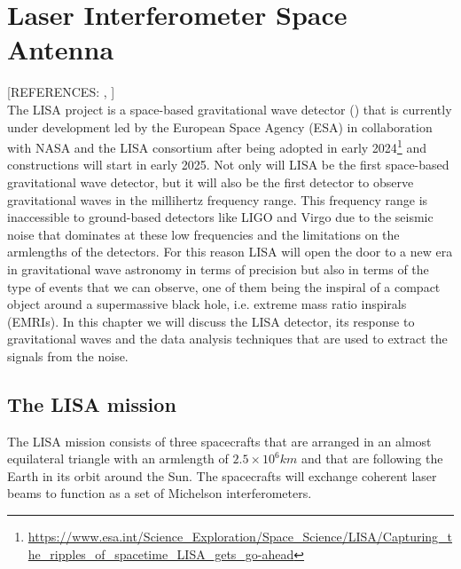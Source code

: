 \chapter{Laser Interferometer Space Antenna}\label{chap:lisa}
[REFERENCES: \cite{babak2021lisasensitivitysnrcalculations}, \cite{PhysRevD.95.103012}]\\
The LISA project is a space-based gravitational wave detector (\cite{colpi2024lisadefinitionstudyreport}) that is currently under development led by the European Space Agency (ESA) in collaboration with NASA and the LISA consortium after being adopted in early 2024\footnote{\url{https://www.esa.int/Science_Exploration/Space_Science/LISA/Capturing_the_ripples_of_spacetime_LISA_gets_go-ahead}} and constructions will start in early 2025. Not only will LISA be the first space-based gravitational wave detector, but it will also be the first detector to observe gravitational waves in the millihertz frequency range. This frequency range is inaccessible to ground-based detectors like LIGO and Virgo due to the seismic noise that dominates at these low frequencies and the limitations on the armlengths of the detectors. For this reason LISA will open the door to a new era in gravitational wave astronomy in terms of precision but also in terms of the type of events that we can observe, one of them being the inspiral of a compact object around a supermassive black hole, i.e. extreme mass ratio inspirals (EMRIs). In this chapter we will discuss the LISA detector, its response to gravitational waves and the data analysis techniques that are used to extract the signals from the noise.

\section{The LISA mission}
The LISA mission consists of three spacecrafts that are arranged in an almost equilateral triangle with an armlength of $2.5 \times 10^6\unit{km}$ and that are following the Earth in its orbit around the Sun. The spacecrafts will exchange coherent laser beams to function as a set of Michelson interferometers.

